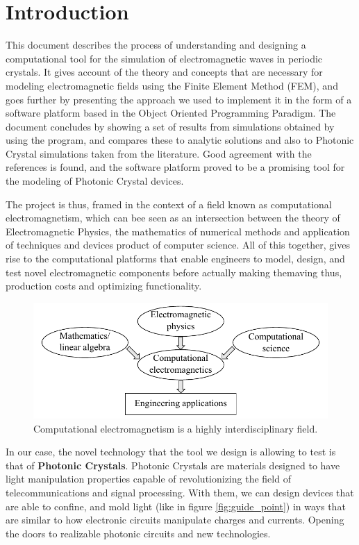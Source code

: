 \cleardoublepage {}
{}
\chapter*{Introduction}

This document describes the process of understanding and designing a computational tool for the simulation of electromagnetic waves in periodic crystals. It gives account of the  theory and concepts that are necessary for modeling electromagnetic fields using the Finite Element Method (FEM), and goes further by presenting the approach we used to implement it in the form of a software platform based in the Object Oriented Programming Paradigm. The document concludes by showing a set of results from simulations obtained by using the program, and compares these to analytic solutions and also to Photonic Crystal simulations taken from the literature. Good agreement with the references is found, and the software platform proved to be a promising tool for the modeling of Photonic Crystal devices.

The project is thus, framed in the context of a field known as computational electromagnetism, which can bee seen as an intersection between the theory of Electromagnetic Physics, the mathematics of numerical methods and application of techniques and devices  product of computer science. All of this together, gives rise to the computational platforms that enable engineers to model, design, and test novel electromagnetic components before actually making themaving thus, production costs and optimizing functionality.  
\begin{figure}
\centering
\includegraphics[scale=1]{./img/interdisciplinary.pdf}
\caption{Computational electromagnetism is a highly interdisciplinary field.  \cite{Jin2010}}
\label{fig:computational}
\end{figure}
In our case, the novel technology that the tool we design is allowing to test is that of \textbf{Photonic Crystals}. Photonic Crystals are materials designed to have light manipulation properties capable of revolutionizing the field of telecommunications and signal processing. With them, we can design devices that are able to confine, and mold light (like in figure \ref{fig:guide_point}) in ways that are similar to how electronic circuits manipulate charges and currents.  Opening the doors to realizable photonic circuits and new technologies.

